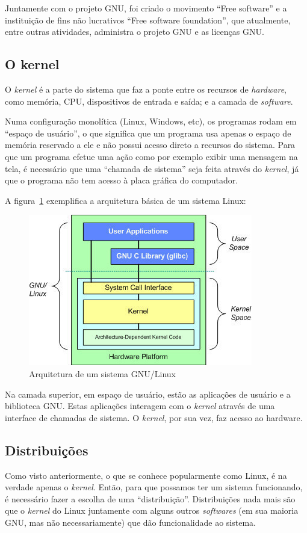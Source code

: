 \documentclass{handout_utfpr}
\begin{document}
Juntamente com o projeto GNU, foi criado o movimento ``Free software'' e a instituição de fins não lucrativos ``Free software foundation'', que atualmente, entre outras atividades, administra o projeto GNU e as licenças GNU.

\subsection{O kernel}\label{kernel}
O \textit{kernel} é a parte do sistema que faz a ponte entre os recursos de \textit{hardware}, como memória, CPU, dispositivos de entrada e saída; e a camada de \textit{software}.

Numa configuração monolítica (Linux, Windows, etc), os programas rodam em ``espaço de usuário'', o que significa que um programa usa apenas o espaço de memória reservado a ele e não possui acesso direto a recursos do sistema. Para que um programa efetue uma ação como por exemplo exibir uma mensagem na tela, é necessário que uma ``chamada de sistema'' seja feita através do \textit{kernel}, já que o programa não tem acesso à placa gráfica do computador.

A figura~\ref{fig:kernel} exemplifica a arquitetura básica de um sistema Linux:
\begin{figure}[!h]
  \centering
  \includegraphics[scale=.8]{imagens/kernel.jpg}
  \caption{Arquitetura de um sistema GNU/Linux}
  \label{fig:kernel}
\end{figure}
Na camada superior, em espaço de usuário, estão as aplicações de usuário e a biblioteca GNU\@. Estas aplicações interagem com o \textit{kernel} através de uma interface de chamadas de sistema. O \textit{kernel}, por sua vez, faz acesso ao hardware.

\subsection{Distribuições}\label{distro}
Como visto anteriormente, o que se conhece popularmente como Linux, é na verdade apenas o \textit{kernel}. Então, para que possamos ter um sistema funcionando, é necessário fazer a escolha de uma ``distribuição''. Distribuições nada mais são que o \textit{kernel} do Linux juntamente com alguns outros \textit{softwares} (em sua maioria GNU, mas não necessariamente) que dão funcionalidade ao sistema.
\end{document}

